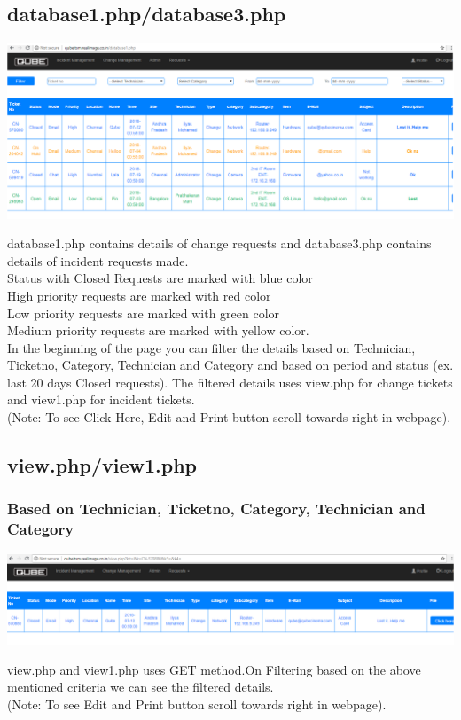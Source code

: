 \documentclass{article}
\begin{document}
\subsection{database1.php/database3.php}
\begin{center}

    \includegraphics[width=7.0in]{database.png}
   
    \label{}

\end{center}
database1.php contains details of change requests and database3.php contains details of incident requests made.\\
Status with Closed Requests are marked with blue color\\
High priority requests are marked with red color\\
Low priority requests are marked with green color\\
Medium priority requests are marked with yellow color.\\
In the beginning of the page you can filter the details based on Technician, Ticketno, Category, Technician and Category and based on period and status \big(ex. last 20 days Closed requests\big). The filtered details uses view.php for change tickets and view1.php for incident tickets.\\
\big(Note: To see Click Here, Edit and Print button scroll towards right in webpage\big).
\subsection{view.php/view1.php}
\subsubsection{Based on Technician, Ticketno, Category, Technician and Category}
\begin{center}

    \includegraphics[width=7.0in]{view.png}
   
    \label{}

\end{center}
view.php and view1.php uses GET method.On Filtering based on the above mentioned criteria we can see the filtered details.\\
\big(Note: To see Edit and Print button scroll towards right in webpage\big).
\end{document}
